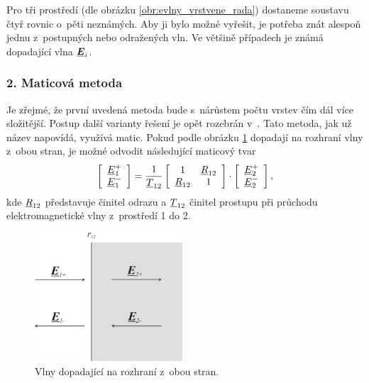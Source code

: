 Pro tři prostředí (dle obrázku \ref{obr:evlny_vrstvene_rada}) dostaneme soustavu čtyř rovnic o~pěti neznámých. Aby ji bylo možné vyřešit, je potřeba znát alespoň jednu z~postupných nebo odražených vln. Ve většině případech je známá dopadající vlna $\mbox{\underline{\boldmath$E$}}_{i}$. 

\subsubsection*{2. Maticová metoda}
Je zřejmé, že první uvedená metoda bude s~nárůstem počtu vrstev čím dál více složitější. Postup další varianty řešení je opět rozebrán v~\cite[str. 105]{emp}. Tato metoda, jak už název napovídá, využívá matic. Pokud podle obrázku \ref{obr:evlny_maticova_metoda1} dopadají na rozhraní vlny z~obou stran, je možné odvodit následující maticový tvar
\begin{equation}
\left[ \begin{array}{c}
{\underline{E}}_{1}^{+} \\
{\underline{E}}_{1}^{-} \\
\end{array} \right]
= 
\frac{1}{{\underline{T}}_ {12}}
\left[ \begin{array}{cc}
1 & {\underline{R}}_{12} \\
{\underline{R}}_{12} & 1 \\
\end{array} \right]
\cdot
\left[ \begin{array}{c}
{\underline{E}}_{2}^{+} \\
{\underline{E}}_{2}^{-} \\
\end{array} \right],
\label{rce:evlny_maticova_rozhrani}
\end{equation}
kde ${\underline{R}}_{12}$ představuje činitel odrazu a ${\underline{T}}_ {12}$ činitel prostupu při průchodu elektromagnetické vlny z~prostředí 1 do 2. 
\begin{figure}[!h]
	\centering
	\includegraphics[width=5.5cm]{evlny_maticova_metoda1.png}
	\caption{Vlny dopadající na rozhraní z~obou stran. \cite{emp}}
	\label{obr:evlny_maticova_metoda1}
\end{figure}

